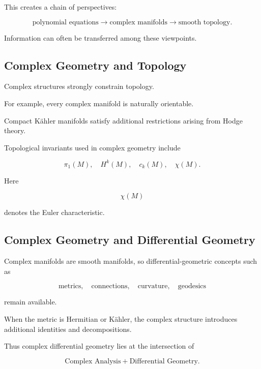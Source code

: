 This creates a chain of perspectives:

\[
\boxed{
\text{polynomial equations}
\longrightarrow
\text{complex manifolds}
\longrightarrow
\text{smooth topology}.
}
\]

Information can often be transferred among these viewpoints.

\subsection{Complex Geometry and Topology}
\label{subsec:complex-geometry-topology}

Complex structures strongly constrain topology.

For example, every complex manifold is naturally orientable.

Compact K\"ahler manifolds satisfy additional restrictions arising from
Hodge theory.

Topological invariants used in complex geometry include

\[
\boxed{
\pi_1(M),
\quad
H^k(M),
\quad
c_k(M),
\quad
\chi(M).
}
\]

Here

\[
\chi(M)
\]

denotes the Euler characteristic.

\subsection{Complex Geometry and Differential Geometry}
\label{subsec:complex-differential-connection}

Complex manifolds are smooth manifolds, so differential-geometric concepts
such as

\[
\text{metrics},
\quad
\text{connections},
\quad
\text{curvature},
\quad
\text{geodesics}
\]

remain available.

When the metric is Hermitian or K\"ahler, the complex structure introduces
additional identities and decompositions.

Thus complex differential geometry lies at the intersection of

\[
\boxed{
\text{Complex Analysis}
+
\text{Differential Geometry}.
}
\]

